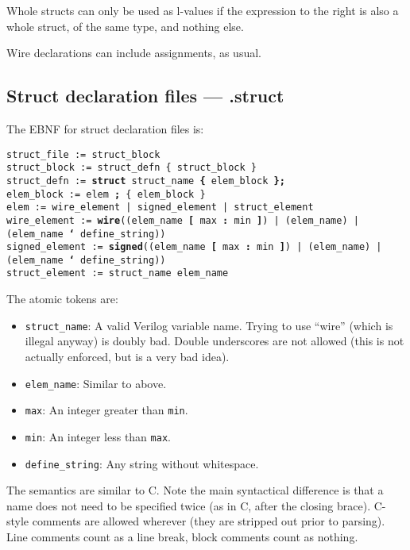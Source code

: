 \documentclass[a4paper]{article} \usepackage[dvips]{graphicx}
\begin{document}
Whole structs can only be used as l-values if the expression to the
right is also a whole struct, of the same type, and nothing else.

Wire declarations can include assignments, as usual.

\subsection{Struct declaration files --- .struct}
\label{sec:struct_files}
The EBNF for struct declaration files is:

\texttt{struct\_file := struct\_block \\
  struct\_block := struct\_defn \{ struct\_block \} \\
  struct\_defn := \textbf{struct} struct\_name
  \textbf{\{} elem\_block \textbf{\};} \\
  elem\_block := elem \textbf{;} \{ elem\_block \} \\
  elem := wire\_element | signed\_element | struct\_element \\
  wire\_element := \textbf{wire}((elem\_name \textbf{[} max \textbf{:}
  min \textbf{]})
  | (elem\_name) | (elem\_name \textbf{`} define\_string)) \\
  signed\_element := \textbf{signed}((elem\_name \textbf{[} max
  \textbf{:} min \textbf{]})
  | (elem\_name) | (elem\_name \textbf{`} define\_string)) \\
  struct\_element := struct\_name elem\_name }

The atomic tokens are:
\begin{itemize}
\item \texttt{struct\_name}: A valid Verilog variable name. Trying to
  use ``wire'' (which is illegal anyway) is doubly bad. Double
  underscores are not allowed (this is not actually enforced, but is a
  very bad idea).
\item \texttt{elem\_name}: Similar to above.
\item \texttt{max}: An integer greater than \texttt{min}.
\item \texttt{min}: An integer less than \texttt{max}.
\item \texttt{define\_string}: Any string without whitespace.
\end{itemize}

The semantics are similar to C. Note the main syntactical difference
is that a name does not need to be specified twice (as in C, after the
closing brace). C-style comments are allowed wherever (they are
stripped out prior to parsing). Line comments count as a line break,
block comments count as nothing.
\end{document}
